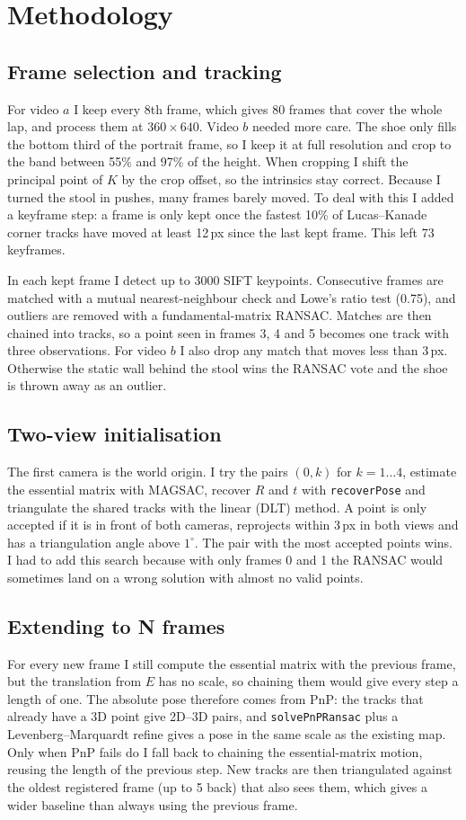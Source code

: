 \documentclass[conference]{assets/latex/IEEEtran}
\begin{document}
\section{Methodology}

\subsection{Frame selection and tracking}
For video $a$ I keep every 8th frame, which gives 80 frames that cover the whole lap, and process
them at $360\times640$. Video $b$ needed more care. The shoe only fills the bottom third of the
portrait frame, so I keep it at full resolution and crop to the band between 55\% and 97\% of
the height. When cropping I shift the principal point of $K$ by the crop offset, so the
intrinsics stay correct. Because I turned the stool in pushes, many frames barely moved. To deal
with this I added a keyframe step: a frame is only kept once the fastest 10\% of
Lucas--Kanade corner tracks have moved at least 12\,px since the last kept frame. This left 73
keyframes.

In each kept frame I detect up to 3000 SIFT keypoints. Consecutive frames are matched with a
mutual nearest-neighbour check and Lowe's ratio test (0.75), and outliers are removed with a
fundamental-matrix RANSAC. Matches are then chained into tracks, so a point seen in frames 3, 4
and 5 becomes one track with three observations. For video $b$ I also drop any match that moves
less than 3\,px. Otherwise the static wall behind the stool wins the RANSAC vote and the shoe is
thrown away as an outlier.

\subsection{Two-view initialisation}
The first camera is the world origin. I try the pairs $(0,k)$ for $k=1\dots4$, estimate the
essential matrix with MAGSAC, recover $R$ and $t$ with \texttt{recoverPose} and triangulate the
shared tracks with the linear (DLT) method. A point is only accepted if it is in front of both
cameras, reprojects within 3\,px in both views and has a triangulation angle above $1^\circ$.
The pair with the most accepted points wins. I had to add this search because with only frames
0 and 1 the RANSAC would sometimes land on a wrong solution with almost no valid points.

\subsection{Extending to N frames}
For every new frame I still compute the essential matrix with the previous frame, but the
translation from $E$ has no scale, so chaining them would give every step a length of one. The
absolute pose therefore comes from PnP: the tracks that already have a 3D point give 2D--3D
pairs, and \texttt{solvePnPRansac} plus a Levenberg--Marquardt refine gives a pose in the same
scale as the existing map. Only when PnP fails do I fall back to chaining the essential-matrix
motion, reusing the length of the previous step. New tracks are then triangulated against the
oldest registered frame (up to 5 back) that also sees them, which gives a wider baseline than
always using the previous frame.
\end{document}
